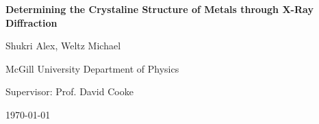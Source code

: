 \documentclass[12pt]{article}
\begin{document}
	
\begin{titlepage}
	\begin{center}
		
		\vspace*{1cm}
		
		\Huge
		\textbf{Determining the Crystaline Structure of Metals through X-Ray Diffraction}
		\large
		\vspace{1.5cm}
		
        Shukri Alex, Weltz Michael
		
		McGill University Department of Physics
		
		Supervisor: Prof. David Cooke
		
		\today
		
	\end{center}
	
\end{titlepage}
\end{document}

